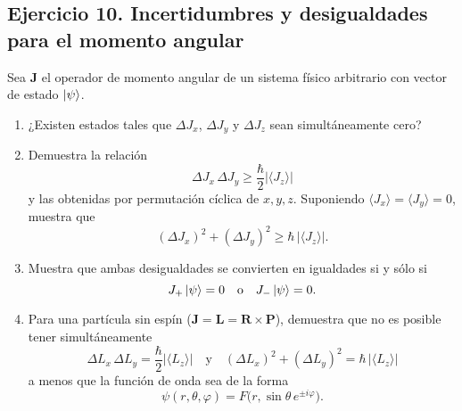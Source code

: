 \documentclass[a4paper,11pt]{article}
\begin{document}
\subsection*{Ejercicio 10. Incertidumbres y desigualdades para el momento angular}
Sea \(\mathbf{J}\) el operador de momento angular de un sistema físico arbitrario con vector de estado \(\ket{\psi}\).
\begin{enumerate}
  \item ¿Existen estados tales que \(\Delta J_x\), \(\Delta J_y\) y \(\Delta J_z\) sean simultáneamente cero?
  \item Demuestra la relación
  \[
    \Delta J_x\,\Delta J_y \ge \frac{\hbar}{2}\bigl|\langle J_z\rangle\bigr|
  \]
  y las obtenidas por permutación cíclica de \(x,y,z\). Suponiendo \(\langle J_x\rangle=\langle J_y\rangle=0\), muestra que
  \[
    (\Delta J_x)^2+(\Delta J_y)^2 \ge \hbar\,\bigl|\langle J_z\rangle\bigr|.
  \]
  \item Muestra que ambas desigualdades se convierten en igualdades si y sólo si
  \[
    J_+\ket{\psi}=0 \quad\text{o}\quad J_-\ket{\psi}=0.
  \]
  \item Para una partícula sin espín (\(\mathbf{J}=\mathbf{L}=\mathbf{R}\times\mathbf{P}\)), demuestra que no es posible tener simultáneamente
  \[
    \Delta L_x\,\Delta L_y = \frac{\hbar}{2}\bigl|\langle L_z\rangle\bigr|
    \quad\text{y}\quad
    (\Delta L_x)^2+(\Delta L_y)^2 = \hbar\,\bigl|\langle L_z\rangle\bigr|
  \]
  a menos que la función de onda sea de la forma
  \[
    \psi(r,\theta,\varphi) = F\bigl(r,\sin\theta\,e^{\pm i\varphi}\bigr).
  \]
\end{enumerate}
\end{document}
